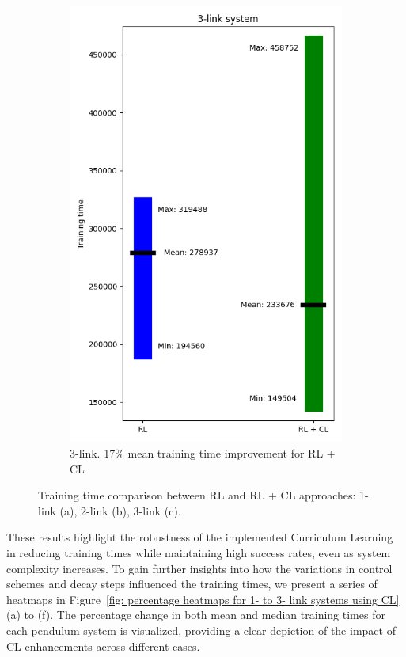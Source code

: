 \begin{figure}[h!]
\begin{subfigure}[t]{0.48\textwidth}
		\includegraphics[width=\textwidth]{Figures/3_link_comparison.png}
		\caption{3-link. 17\% mean training time improvement for RL + CL}
	\end{subfigure}
	
	\caption{Training time comparison between RL and RL + CL approaches: 1-link (a), 2-link (b), 3-link (c).}
	\label{fig: CL results comparison}
\end{figure}

These results highlight the robustness of the implemented Curriculum Learning in reducing training times while maintaining high success rates, even as system complexity increases. To gain further insights into how the variations in control schemes and decay steps influenced the training times, we present a series of heatmaps in Figure~\ref{fig: percentage heatmaps for 1- to 3- link systems using CL} (a) to (f). The percentage change in both mean and median training times for each pendulum system is visualized, providing a clear depiction of the impact of CL enhancements across different cases.

